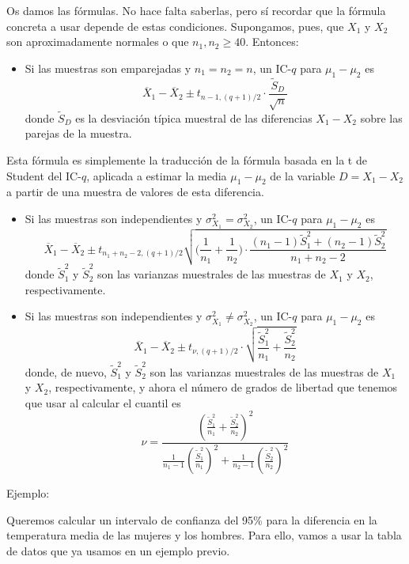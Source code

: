 \documentclass[
  spanish,
  letterpaper,
  DIV=11,
  numbers=noendperiod]{scrreprt}
\providecommand{\tightlist}{%
  \setlength{\itemsep}{0pt}\setlength{\parskip}{0pt}}
\begin{document}
Os damos las fórmulas. No hace falta saberlas, pero sí recordar que la
fórmula concreta a usar depende de estas condiciones. Supongamos, pues,
que \(X_1\) y \(X_2\) son aproximadamente normales o que
\(n_1,n_2\geqslant 40\). Entonces:

\begin{itemize}
\tightlist
\item
  Si las muestras son emparejadas y \(n_1=n_2=n\), un IC-\(q\) para
  \(\mu_1-\mu_2\) es \[
  \overline{X}_1-\overline{X}_2\pm t_{n-1,(q+1)/2}\cdot \frac{\widetilde{S}_D}{\sqrt{n}}
  \] donde \(\widetilde{S}_D\) es la desviación típica muestral de las
  diferencias \(X_1-X_2\) sobre las parejas de la muestra.
\end{itemize}

Esta fórmula es simplemente la traducción de la fórmula basada en la t
de Student del IC-\(q\), aplicada a estimar la media \(\mu_1-\mu_2\) de
la variable \(D=X_1-X_2\) a partir de una muestra de valores de esta
diferencia.

\begin{itemize}
\item
  Si las muestras son independientes y
  \(\sigma_{X_1}^2=\sigma_{X_2}^2\), un IC-\(q\) para \(\mu_1-\mu_2\) es
  \[
  \overline{X}_1-\overline{X}_2\pm t_{n_1+n_2-2,(q+1)/2} \sqrt{\Big(\frac{1}{n_1}+\frac{1}{n_2}\Big)\cdot 
  \frac{(n_1-1)\widetilde{S}_1^2+(n_2-1)\widetilde{S}_2^2}
  {n_1+n_2-2}}
  \] donde \(\widetilde{S}_1^2\) y \(\widetilde{S}_2^2\) son las
  varianzas muestrales de las muestras de \(X_1\) y \(X_2\),
  respectivamente.
\item
  Si las muestras son independientes y
  \(\sigma_{X_1}^2\neq \sigma_{X_2}^2\), un IC-\(q\) para
  \(\mu_1-\mu_2\) es \[
  \overline{X}_1-\overline{X}_2\pm t_{\nu,(q+1)/2}\cdot\sqrt{\frac{\widetilde{S}_1^2}{n_1}+\frac{\widetilde{S}_2^2}{n_2}}
  \] donde, de nuevo, \(\widetilde{S}_1^2\) y \(\widetilde{S}_2^2\) son
  las varianzas muestrales de las muestras de \(X_1\) y \(X_2\),
  respectivamente, y ahora el número de grados de libertad que tenemos
  que usar al calcular el cuantil es \[
  \nu=\frac{\displaystyle \left( \frac{\widetilde{S}_1^2}{n_1}+\frac{\widetilde{S}_2^2}{n_2}\right)^2}{\displaystyle \frac{1}{n_1-1}\left(\frac{\widetilde{S}_1^2}{n_1}\right)^2+\frac{1}{n_2-1}\left(\frac{\widetilde{S}_2^2}{n_2}\right)^2}
  \]
\end{itemize}

Ejemplo:

Queremos calcular un intervalo de confianza del 95\% para la diferencia
en la temperatura media de las mujeres y los hombres. Para ello, vamos a
usar la tabla de datos que ya usamos en un ejemplo previo.
\end{document}
